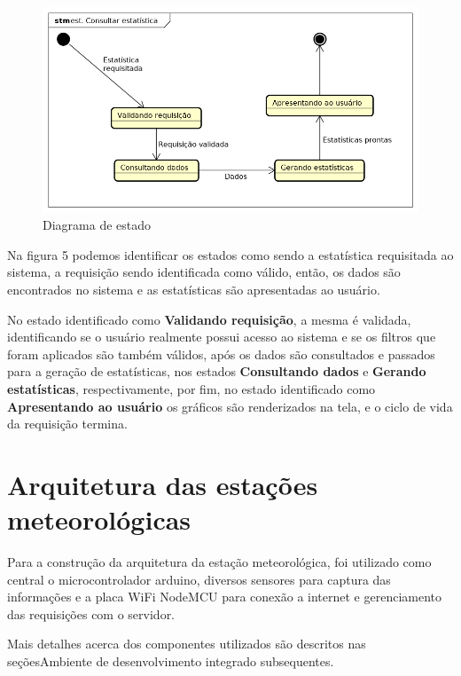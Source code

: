 \begin{center}
\begin{figure}[H]
    \centering
    \caption{Diagrama de estado \label{fig:figure_diagrama_estado}}
    \includegraphics[scale=0.7]{diagrams/estado.png}
    \hfill
{}
\end{figure}
\end{center}

Na figura 5 podemos identificar os estados como sendo a estatística requisitada ao sistema, a requisição sendo identificada como válido, então, os dados são encontrados no sistema e as estatísticas são apresentadas ao usuário.

No estado identificado como \textbf{Validando requisição}, a mesma é validada, identificando se o usuário realmente possui acesso ao sistema e se os filtros que foram aplicados são também válidos, após os dados são consultados e passados para a geração de estatísticas, nos estados \textbf{Consultando dados} e \textbf{Gerando estatísticas}, respectivamente, por fim, no estado identificado como \textbf{Apresentando ao usuário} os gráficos são renderizados na tela, e o ciclo de vida da requisição termina.

\section{Arquitetura das estações meteorológicas}

Para a construção da arquitetura da estação meteorológica, foi utilizado como central o microcontrolador arduino, diversos sensores para captura das informações e a placa WiFi NodeMCU para conexão a internet e gerenciamento das requisições com o servidor.

Mais detalhes acerca dos componentes utilizados são descritos nas seçõesAmbiente de desenvolvimento integrado subsequentes.

